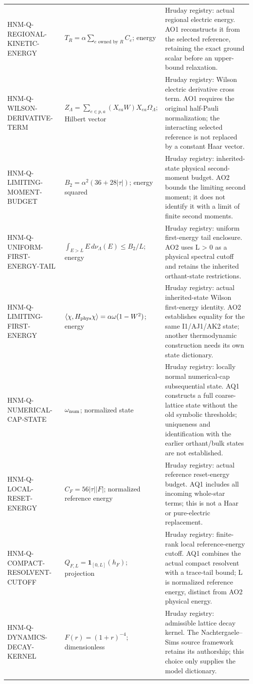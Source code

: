 \begin{longtable}{@{}p{37mm}p{40mm}p{72mm}@{}}
HNM-Q-REGIONAL-KINETIC-ENERGY & $T_R=\alpha\sum_{e\text{ owned by }R}C_e$; energy & Hruday registry: actual regional electric energy. AO1 reconstructs it from the selected reference, retaining the exact ground scalar before an upper-bound relaxation.\\\addlinespace
HNM-Q-WILSON-DERIVATIVE-TERM & $Z_\Lambda=\sum_{e\in p,a}(X_{ea}W)X_{ea}\Omega_\Lambda$; Hilbert vector & Hruday registry: Wilson electric derivative cross term. AO1 requires the original half-Pauli normalization; the interacting selected reference is not replaced by a constant Haar vector.\\\addlinespace
HNM-Q-LIMITING-MOMENT-BUDGET & $B_2=\alpha^2(36+28|\tau|)$; energy squared & Hruday registry: inherited-state physical second-moment budget. AO2 bounds the limiting second moment; it does not identify it with a limit of finite second moments.\\\addlinespace
HNM-Q-UNIFORM-FIRST-ENERGY-TAIL & $\int_{E>L}E\,d\nu_\Lambda(E)\le B_2/L$; energy & Hruday registry: uniform first-energy tail enclosure. AO2 uses L > 0 as a physical spectral cutoff and retains the inherited orthant-state restrictions.\\\addlinespace
HNM-Q-LIMITING-FIRST-ENERGY & $\langle\chi,H_{\rm phys}\chi\rangle=\alpha\omega(1-W^2)$; energy & Hruday registry: actual inherited-state Wilson first-energy identity. AO2 establishes equality for the same I1/AJ1/AK2 state; another thermodynamic construction needs its own state dictionary.\\\addlinespace
HNM-Q-NUMERICAL-CAP-STATE & $\omega_{\rm num}$; normalized state & Hruday registry: locally normal numerical-cap subsequential state. AQ1 constructs a full coarse-lattice state without the old symbolic thresholds; uniqueness and identification with the earlier orthant/bulk states are not established.\\\addlinespace
HNM-Q-LOCAL-RESET-ENERGY & $C_F=56|\tau||F|$; normalized reference energy & Hruday registry: actual reference reset-energy budget. AQ1 includes all incoming whole-star terms; this is not a Haar or pure-electric replacement.\\\addlinespace
HNM-Q-COMPACT-RESOLVENT-CUTOFF & $Q_{F,L}=\mathbf1_{[0,L]}(h_F)$; projection & Hruday registry: finite-rank local reference-energy cutoff. AQ1 combines the actual compact resolvent with a trace-tail bound; L is normalized reference energy, distinct from AO2 physical energy.\\\addlinespace
HNM-Q-DYNAMICS-DECAY-KERNEL & $F(r)=(1+r)^{-4}$; dimensionless & Hruday registry: admissible lattice decay kernel. The Nachtergaele--Sims source framework retains its authorship; this choice only supplies the model dictionary.\\\addlinespace

\end{longtable}
